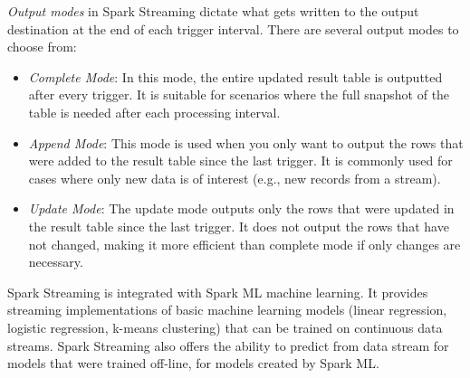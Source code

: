 \begin{advanced}
\emph{Output modes} in Spark Streaming dictate what gets written to the output destination at the end of each trigger interval. There are several output modes to choose from:

\begin{itemize}
\item \emph{Complete Mode}: In this mode, the entire updated result table is outputted after every trigger. It is suitable for scenarios where the full snapshot of the table is needed after each processing interval.

\item \emph{Append Mode}: This mode is used when you only want to output the rows that were added to the result table since the last trigger. It is commonly used for cases where only new data is of interest (e.g., new records from a stream).

\item \emph{Update Mode}: The update mode outputs only the rows that were updated in the result table since the last trigger. It does not output the rows that have not changed, making it more efficient than complete mode if only changes are necessary.
\end{itemize}

Spark Streaming is integrated with Spark ML machine learning. It provides streaming implementations of basic machine learning models (linear regression, logistic regression, k-means clustering) that can be trained on continuous data streams. Spark Streaming also offers the ability to predict from data stream for models that were trained off-line, for models created by Spark ML.
\end{advanced}


